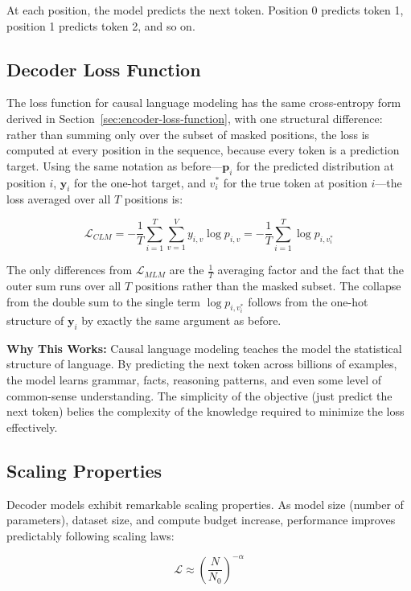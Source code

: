 \documentclass{book}
\begin{document}
At each position, the model predicts the next token. Position 0 predicts token 1, position 1 predicts token 2, and so on.

\subsection{Decoder Loss Function}

The loss function for causal language modeling has the same cross-entropy form
derived in Section~\ref{sec:encoder-loss-function}, with one structural
difference: rather than summing only over the subset of masked positions, the
loss is computed at every position in the sequence, because every token is a
prediction target. Using the same notation as before---$\mathbf{p}_i$ for the
predicted distribution at position $i$, $\mathbf{y}_i$ for the one-hot target,
and $v^*_i$ for the true token at position $i$---the loss averaged over all
$T$ positions is:

\begin{equation}
\mathcal{L}_{CLM}
    = -\frac{1}{T} \sum_{i=1}^{T} \sum_{v=1}^{V} y_{i,v} \log p_{i,v}
    = -\frac{1}{T} \sum_{i=1}^{T} \log p_{i,v^*_i}
\end{equation}

The only differences from $\mathcal{L}_{MLM}$ are the $\frac{1}{T}$
averaging factor and the fact that the outer sum runs over all $T$ positions
rather than the masked subset. The collapse from the double sum to the single
term $\log p_{i,v^*_i}$ follows from the one-hot structure of $\mathbf{y}_i$
by exactly the same argument as before.


\textbf{Why This Works:} Causal language modeling teaches the model the statistical structure of language. By predicting the next token across billions of examples, the model learns grammar, facts, reasoning patterns, and even some level of common-sense understanding. The simplicity of the objective (just predict the next token) belies the complexity of the knowledge required to minimize the loss effectively.

\subsection{Scaling Properties}

Decoder models exhibit remarkable scaling properties. As model size (number of parameters), dataset size, and compute budget increase, performance improves predictably following scaling laws:

\begin{equation}
\mathcal{L} \approx \left(\frac{N}{N_0}\right)^{-\alpha}
\end{equation}
\end{document}
